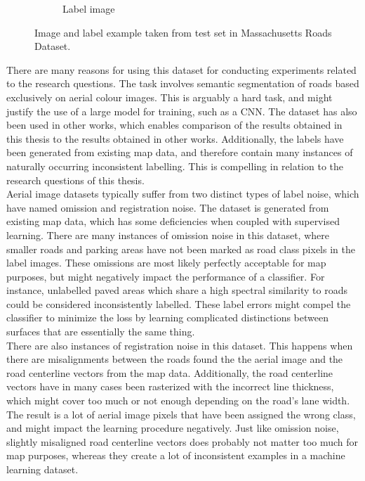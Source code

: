 \begin{figure}
\begin{subfigure}{0.48\textwidth}
\caption{Label image} \label{fig:mass_roads_example_label}
\end{subfigure}
\hspace*{\fill} %
\caption[Massachusetts Roads Dataset]{Image and label example taken from test set in Massachusetts Roads Dataset.} \label{fig:mass_roads_example}
\end{figure}


There are many reasons for using this dataset for conducting experiments related to the research questions.  The task involves semantic segmentation of roads based exclusively on aerial colour images. This is arguably a hard task, and might justify the use of a large model for training, such as a \ac{CNN}. The dataset has also been used in other works, which enables comparison of the results obtained in this thesis to the results obtained in other works. Additionally, the labels have been generated from existing map data, and therefore contain many instances of naturally occurring inconsistent labelling. This is compelling in relation to the research questions of this thesis.\\

Aerial image datasets typically suffer from two distinct types of label noise, which \cite{Mnih_aerial_images_noisy} have named omission and registration noise. The dataset is generated from existing map data, which has some deficiencies when coupled with supervised learning. There are many instances of omission noise in this dataset, where smaller roads and parking areas have not been marked as road class pixels in the label images. These omissions are most likely perfectly acceptable for map purposes, but might negatively impact the performance of a classifier.  For instance, unlabelled paved areas which share a high spectral similarity to roads could be considered inconsistently labelled. These label errors might compel the classifier to minimize the loss by learning complicated distinctions between surfaces that are essentially the same thing.\\

There are also instances of registration noise in this dataset. This happens when there are misalignments between the roads found the the aerial image and the road centerline vectors from the map data. Additionally, the road centerline vectors have in many cases been rasterized with the incorrect line thickness, which might cover too much or not enough depending on the road's lane width. The result is a lot of aerial image pixels that have been assigned the wrong class, and might impact the learning procedure negatively. Just like omission noise, slightly misaligned road centerline vectors does probably not matter too much for map purposes, whereas they create a lot of inconsistent examples in a machine learning dataset.


